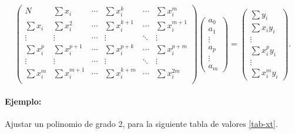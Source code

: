 \begin{equation}
\left(\begin{array}{cccccc}
N & \sum x_i & \cdots &  \sum x_i^k & \cdots & \sum x_i^m \\
\sum x_i &  \sum x_i^2 & \cdots &  \sum x_i^{k+1} & \cdots & \sum x_i^{m+1} \\
\vdots & \vdots & \cdots & \vdots & \ddots & \vdots \\
\sum x^p_i &  \sum x_i^{p+1} & \cdots &  \sum x_i^{p+k} & \cdots & \sum x_i^{p+m} \\
\vdots & \vdots & \cdots & \vdots & \ddots & \vdots \\
\sum x_i^m &  \sum x_i^{m+1} & \cdots &  \sum x_i^{k+m} & \cdots & \sum x_i^{2m} \\
\end{array}
\right)\left(\begin{array}{c}a_0\\a_1\\ \vdots\\a_p\\ \vdots\\a_m\end{array}\right)
=\left(\begin{array}{c}
\sum y_i\\ \sum x_iy_i\\ \vdots\\ \sum x_i^py_i\\ \vdots\\ \sum x_i^m y_i\end{array}\right).
\end{equation}


\paragraph{Ejemplo:}  Ajustar un polinomio de grado 2, para la siguiente tabla de valores \ref{tab-xt}.

